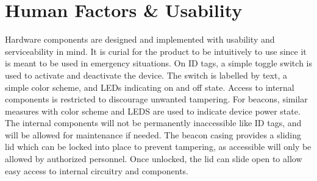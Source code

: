 

\setcounter{section}{4}
\section{Human Factors \& Usability}

\bigskip
Hardware components are designed and implemented with usability and serviceability in mind. It is curial for the product to be intuitively to use since it is meant to be used in emergency situations. On ID tags, a simple toggle switch is used to activate and deactivate the device. The switch is labelled by text, a simple color scheme, and LEDs indicating on and off state. Access to internal components is restricted to discourage unwanted tampering. For beacons, similar measures with color scheme and LEDS are used to indicate device power state. The internal components will not be permanently inaccessible like ID tags, and will be allowed for maintenance if needed. The beacon casing provides a sliding lid which can be locked into place to prevent tampering, as accessible will only be allowed by authorized personnel.  Once unlocked, the lid can slide open to allow easy access to internal circuitry and components. 

\bigskip